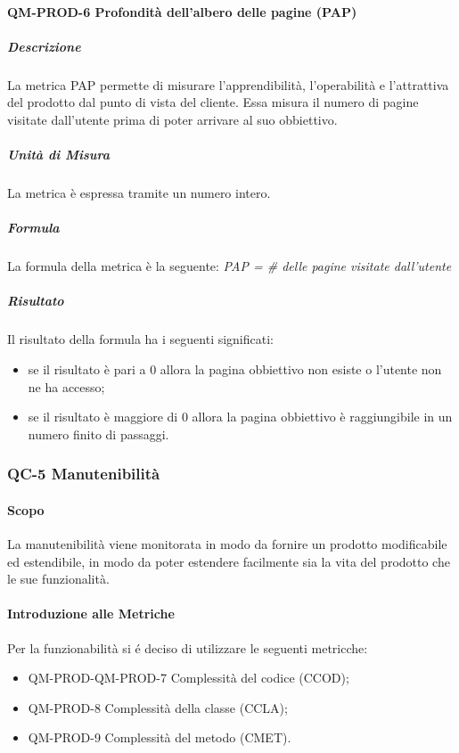 		\paragraph{QM-PROD-6 Profondità dell'albero delle pagine (PAP)}
			\subparagraph{Descrizione}
				La metrica PAP permette di misurare l'apprendibilità, l'operabilità e l'attrattiva del prodotto dal punto di vista del cliente. Essa misura il numero di pagine visitate dall'utente prima di poter arrivare al suo obbiettivo.
			\subparagraph{Unità di Misura}
				La metrica è espressa tramite un numero intero.
			\subparagraph{Formula}
				La formula della metrica è la seguente:
				\textit{PAP = \# delle pagine visitate dall'utente}
			\subparagraph{Risultato}
				Il risultato della formula ha i seguenti significati:
				\begin{itemize}
					\item se il risultato è pari a 0 allora la pagina obbiettivo non esiste o l'utente non ne ha accesso;
					\item se il risultato è maggiore di 0 allora la pagina obbiettivo è raggiungibile in un numero finito di passaggi.
				\end{itemize}

	\subsubsection{QC-5 Manutenibilità}
		\paragraph{Scopo}
			La manutenibilità viene monitorata in modo da fornire un prodotto modificabile ed estendibile, in modo da poter estendere facilmente sia la vita del prodotto che le sue funzionalità.
		\paragraph{Introduzione alle Metriche}
			Per la funzionabilità si é deciso di utilizzare le seguenti metricche:
			\begin{itemize}
				\item QM-PROD-QM-PROD-7 Complessità del codice (CCOD);
				\item QM-PROD-8 Complessità della classe (CCLA);
				\item QM-PROD-9 Complessità del metodo (CMET).
			\end{itemize}
